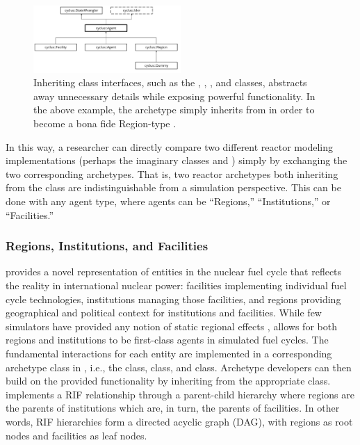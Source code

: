 \begin{figure}[htbp!]
\begin{center}
\includegraphics[width=0.5\textwidth]{./images/agent_uml}
\end{center}
\caption{Inheriting \Cyclus class interfaces, such as the ,
, , and  classes, abstracts away
unnecessary details while exposing powerful functionality. In the above
example, the  archetype simply inherits from  in
order to become a bona fide Region-type .}
\label{fig:agent_uml}
\end{figure}

In this way, a researcher can directly compare two different reactor modeling
implementations (perhaps the imaginary classes  and )
simply by exchanging the two corresponding archetypes. That is, two reactor
archetypes both inheriting from the  class are indistinguishable
from a simulation perspective.  This can be done with any agent type, where agents can be ``Regions,'' ``Institutions,'' or ``Facilities.''

\subsubsection{Regions, Institutions, and Facilities}
\label{sec:rif}

\Cyclus provides a novel representation of entities in the nuclear fuel cycle
that reflects the reality in international nuclear power: facilities implementing individual fuel cycle technologies, institutions managing those facilities, and regions providing geographical and political context for institutions and facilities. While
few simulators have provided any notion of static regional
effects \cite{huff_next_2010,juchau_modeling_2010}, \Cyclus allows for both regions and institutions to be first-class
agents in simulated fuel cycles. The fundamental interactions for each entity are implemented in a corresponding
archetype class in \Cyclus, i.e., the  class, 
class, and  class. Archetype developers can then build on the
provided functionality by inheriting from the appropriate class.
\Cyclus implements a \gls{RIF} relationship through a
parent-child hierarchy where
regions are the parents of institutions which are, in turn, the parents of
facilities. In other words, \gls{RIF} hierarchies form a directed acyclic graph (DAG),
with regions as root nodes and facilities as leaf nodes.

